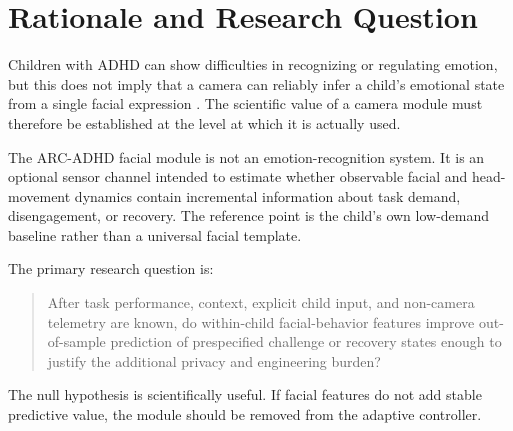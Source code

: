 \section{Rationale and Research Question}

Children with ADHD can show difficulties in recognizing or regulating emotion, but this does not imply that a camera can reliably infer a child's emotional state from a single facial expression \parencite{olayagalindo2023facial,shepard2025emotion}. The scientific value of a camera module must therefore be established at the level at which it is actually used.

The ARC-ADHD facial module is not an emotion-recognition system. It is an optional sensor channel intended to estimate whether observable facial and head-movement dynamics contain incremental information about task demand, disengagement, or recovery. The reference point is the child's own low-demand baseline rather than a universal facial template.

The primary research question is:

\begin{quote}
After task performance, context, explicit child input, and non-camera telemetry are known, do within-child facial-behavior features improve out-of-sample prediction of prespecified challenge or recovery states enough to justify the additional privacy and engineering burden?
\end{quote}

The null hypothesis is scientifically useful. If facial features do not add stable predictive value, the module should be removed from the adaptive controller.
